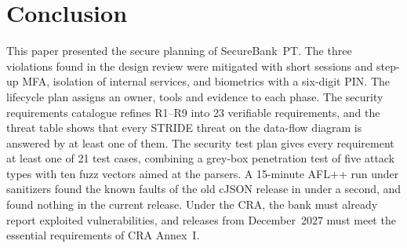 \section{Conclusion}
\label{sec:conclusion}

This paper presented the secure planning of SecureBank~PT. The three
violations found in the design review were mitigated with short sessions
and step-up \ac{MFA}, isolation of internal services, and biometrics with
a six-digit \ac{PIN}. The lifecycle plan assigns an owner, tools and
evidence to each phase. The security requirements catalogue refines
R1--R9 into 23 verifiable requirements, and the threat table shows that
every \ac{STRIDE} threat on the data-flow diagram is answered by at least
one of them. The security test plan gives every requirement at least
one of 21 test cases, combining a grey-box penetration test of five
attack types with ten fuzz vectors aimed at the parsers. A 15-minute
AFL++ run under sanitizers found the known faults of the old cJSON
release in under a second, and found nothing in the current release. Under the \ac{CRA}, the bank must already report
exploited vulnerabilities, and releases from December~2027 must meet
the essential requirements of \ac{CRA} Annex~I.
